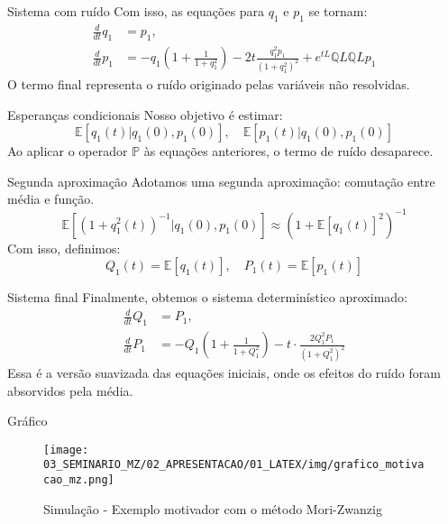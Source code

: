 \begin{frame}{Sistema com ruído}
	Com isso, as equações para $q_1$ e $p_1$ se tornam:
	\begin{align*}
		\frac{d}{dt} q_1 & = p_1,                                                                                                              \\
		\frac{d}{dt} p_1 & = -q_1\left(1 + \frac{1}{1 + q_1^2}\right) - 2t\frac{q_1^2 p_1}{(1 + q_1^2)^2} + e^{tL} \mathbb{Q}L \mathbb{Q}L p_1 
	\end{align*}
	O termo final representa o ruído originado pelas variáveis não resolvidas.
\end{frame}

\begin{frame}{Esperanças condicionais}
	Nosso objetivo é estimar:
	\begin{equation*}
		\mathbb{E}[q_1(t) | q_1(0), p_1(0)], \quad \mathbb{E}[p_1(t) | q_1(0), p_1(0)]
	\end{equation*}
	Ao aplicar o operador $\mathbb{P}$ às equações anteriores, o termo de ruído desaparece.
\end{frame}

\begin{frame}{Segunda aproximação}
	Adotamos uma segunda aproximação: comutação entre média e função.
	\begin{equation*}
		\mathbb{E}[(1 + q_1^2(t))^{-1} | q_1(0), p_1(0)] \approx \left(1 + \mathbb{E}[q_1(t)]^2\right)^{-1}
	\end{equation*}
	Com isso, definimos:
	\begin{equation*}
		Q_1(t) = \mathbb{E}[q_1(t)], \quad P_1(t) = \mathbb{E}[p_1(t)]
	\end{equation*}
\end{frame}

\begin{frame}{Sistema final}
	Finalmente, obtemos o sistema determinístico aproximado:
	\begin{align*}
		\frac{d}{dt} Q_1 & = P_1,                                                                                  \\
		\frac{d}{dt} P_1 & = -Q_1\left(1 + \frac{1}{1 + Q_1^2} \right) - t \cdot \frac{2 Q_1^2 P_1}{(1 + Q_1^2)^2} 
	\end{align*}
	Essa é a versão suavizada das equações iniciais, onde os efeitos do ruído foram absorvidos pela média.
\end{frame}


\begin{frame}{Gráfico}
	\begin{figure}[h]
		\centering
		\texttt{[image: 03\_SEMINARIO\_MZ/02\_APRESENTACAO/01\_LATEX/img/grafico\_motivacao\_mz.png]}
		\caption{Simulação - Exemplo motivador com o método Mori-Zwanzig}
		\label{fig:simulacao_exemplo_motivador_mz}
	\end{figure}
\end{frame}

